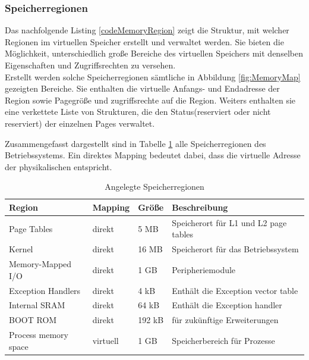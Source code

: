 \subsubsection{Speicherregionen}

Das nachfolgende Listing \ref{codeMemoryRegion} zeigt die Struktur, mit welcher Regionen im virtuellen Speicher erstellt und verwaltet werden. Sie bieten die Möglichkeit, unterschiedlich große Bereiche des virtuellen Speichers mit denselben Eigenschaften und Zugriffsrechten zu versehen.\\

Erstellt werden solche Speicherregionen sämtliche in Abbildung \ref{fig:MemoryMap} gezeigten Bereiche. Sie enthalten die virtuelle Anfangs- und Endadresse der Region sowie Pagegröße und zugriffsrechte auf die Region. Weiters enthalten sie eine verkettete Liste von Strukturen, die den Status(reserviert oder nicht reserviert) der einzelnen Pages verwaltet.\\


\vspace{0.5cm}

Zusammengefasst dargestellt sind in Tabelle \ref{table:MemoryRegions} alle Speicherregionen des Betriebssystems. Ein direktes Mapping bedeutet dabei, dass die virtuelle Adresse der physikalischen entspricht.\\

\begin{table}[H]
\begin{tabular}{p{4cm} | p{1.5cm} | p{1.5cm} | p{6cm}}
  \textbf{Region} & \textbf{Mapping} & \textbf{Größe} & \textbf{Beschreibung} \\ \hline
  Page Tables & direkt & 5 MB & Speicherort für L1 und L2 page tables\\
  Kernel & direkt & 16 MB & Speicherort für das Betriebssystem\\
  Memory-Mapped I/O & direkt &  1 GB & Peripheriemodule\\
  Exception Handlers & direkt &  4 kB & Enthält die Exception vector table\\
  Internal SRAM & direkt & 64 kB & Enthält die Exception handler\\
  BOOT ROM & direkt & 192 kB & für zukünftige Erweiterungen \\ 
  Process memory space & virtuell & 1 GB & Speicherbereich für Prozesse
 \end{tabular}
 \caption{Angelegte Speicherregionen}
 \label{table:MemoryRegions}
\end{table}


